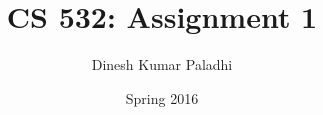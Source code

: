 \documentclass[letterpaper]{report}
\begin{document}
\renewcommand{\thesection}{\arabic{section}}

\author{Dinesh Kumar Paladhi}
\title{CS 532: Assignment 1}
\date{Spring 2016}

\maketitle

\tableofcontents





\nocite{*}
\end{document}
